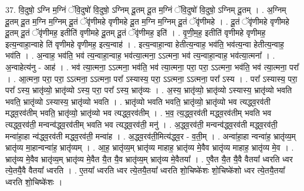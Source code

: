 \documentclass[17pt]{extarticle}
\begin{document}
37. वि॒दुषो॒ ऽग्नि म॒ग्निं ॅवि॒दुषो॑ वि॒दुषो॒ ऽग्निम् दू॒तम् दू॒त म॒ग्निं ॅवि॒दुषो॑ वि॒दुषो॒ ऽग्निम् दू॒तम् । . अ॒ग्निम् दू॒तम् दू॒त म॒ग्नि म॒ग्निम् दू॒तं ॅवृ॑णीमहे वृणीमहे दू॒त म॒ग्नि म॒ग्निम् दू॒तं ॅवृ॑णीमहे । . दू॒तं ॅवृ॑णीमहे वृणीमहे दू॒तम् दू॒तं ॅवृ॑णीमह॒ इतीति॑ वृणीमहे दू॒तम् दू॒तं ॅवृ॑णीमह॒ इति॑ । . वृ॒णी॒म॒ह॒ इतीति॑ वृणीमहे वृणीमह॒ इत्य॒न्वाहा॒न्वाहे ति॑ वृणीमहे वृणीमह॒ इत्य॒न्वाह॑ । . इत्य॒न्वाहा॒न्वा हेतीत्य॒न्वाह॒ भव॑ति॒ भव॑त्य॒न्वा हेतीत्य॒न्वाह॒ भव॑ति । . अ॒न्वाह॒ भव॑ति॒ भव॑ त्य॒न्वाहा॒न्वाह॒ भव॑त्या॒त्मना॒ ऽऽत्मना॒ भव॑ त्य॒न्वाहा॒न्वाह॒ भव॑त्या॒त्मना᳚ । . अ॒न्वाहेत्य॑नु - आह॑ । . भव॑ त्या॒त्मना॒ ऽऽत्मना॒ भव॑ति॒ भव॑ त्या॒त्मना॒ परा॒ परा॒ ऽऽत्मना॒ भव॑ति॒ भव॑ त्या॒त्मना॒ परा᳚ । . आ॒त्मना॒ परा॒ परा॒ ऽऽत्मना॒ ऽऽत्मना॒ परा᳚ ऽस्यास्य॒ परा॒ ऽऽत्मना॒ ऽऽत्मना॒ परा᳚ ऽस्य । . परा᳚ ऽस्यास्य॒ परा॒ परा᳚ ऽस्य॒ भ्रातृ॑व्यो॒ भ्रातृ॑व्यो ऽस्य॒ परा॒ परा᳚ ऽस्य॒ भ्रातृ॑व्यः । . अ॒स्य॒ भ्रातृ॑व्यो॒ भ्रातृ॑व्यो ऽस्यास्य॒ भ्रातृ॑व्यो भवति भवति॒ भ्रातृ॑व्यो ऽस्यास्य॒ भ्रातृ॑व्यो भवति । . भ्रातृ॑व्यो भवति भवति॒ भ्रातृ॑व्यो॒ भ्रातृ॑व्यो भव त्यद्ध्व॒रव॑ती मद्ध्व॒रव॑तीम् भवति॒ भ्रातृ॑व्यो॒ भ्रातृ॑व्यो भव त्यद्ध्व॒रव॑तीम् । . भ॒व॒ त्य॒द्ध्व॒रव॑ती मद्ध्व॒रव॑तीम् भवति भव त्यद्ध्व॒रव॑ती॒ मन्वन्व॑द्ध्व॒रव॑तीम् भवति भव त्यद्ध्व॒रव॑ती॒ मनु॑ । . अ॒द्ध्व॒रव॑ती॒ मन्वन्व॑द्ध्व॒रव॑ती मद्ध्व॒रव॑ती॒ मन्वा॑हा॒हा न्व॑द्ध्व॒रव॑ती मद्ध्व॒रव॑ती॒ मन्वा॑ह । . अ॒द्ध्व॒रव॑ती॒मित्य॑द्ध्व॒र - व॒ती॒म् । . अन्वा॑हा॒हा न्वन्वा॑ह॒ भ्रातृ॑व्य॒म् भ्रातृ॑व्य मा॒हान्वन्वा॑ह॒ भ्रातृ॑व्यम् । . आ॒ह॒ भ्रातृ॑व्य॒म् भ्रातृ॑व्य माहाह॒ भ्रातृ॑व्य मे॒वैव भ्रातृ॑व्य माहाह॒ भ्रातृ॑व्य मे॒व । . भ्रातृ॑व्य मे॒वैव भ्रातृ॑व्य॒म् भ्रातृ॑व्य मे॒वैत यै॒त यै॒व भ्रातृ॑व्य॒म् भ्रातृ॑व्य मे॒वैतया᳚ । . ए॒वैत यै॒त यै॒वै वैतया᳚ ध्वरति ध्वर त्ये॒तयै॒वै वैतया᳚ ध्वरति । . ए॒तया᳚ ध्वरति ध्वर त्ये॒तयै॒तया᳚ ध्वरति शो॒चिष्के॑शः शो॒चिष्के॑शो ध्वर त्ये॒तयै॒तया᳚ ध्वरति शो॒चिष्के॑शः । \newline
\pagebreak
{}
\end{document}
